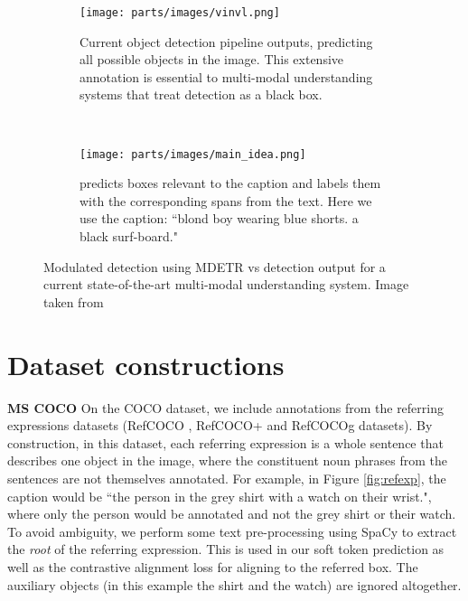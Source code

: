\begin{figure}[t]
     \centering
     \begin{subfigure}[b]{0.48\textwidth}
         \centering
         \texttt{[image: parts/images/vinvl.png]}
         \caption{Current object detection pipeline outputs, predicting all possible objects in the image. This extensive annotation is essential to multi-modal understanding systems that treat detection as a black box.\label{fig:main_idea_1}}
     \end{subfigure}
     ~
     \begin{subfigure}[b]{0.48\textwidth}
         \centering
         \texttt{[image: parts/images/main\_idea.png]}
         \caption{ \Alg predicts boxes relevant to the caption and labels them with the corresponding spans from the text. 
         Here we use the caption: ``blond boy wearing blue shorts. a black surf-board."\label{fig:main_idea_2}}
         
     \end{subfigure}
        \caption{Modulated detection using MDETR vs detection output for a current state-of-the-art multi-modal understanding system. Image taken from \cite{zhang2021vinvl}\label{fig:three graphs}}
\end{figure}

\section{Dataset constructions}
\label{sec:appendix_datasets}
\textbf{MS COCO} On the COCO dataset, we include annotations from the referring expressions datasets (RefCOCO \cite{yu_modeling_2016}, RefCOCO+ \cite{yu_modeling_2016} and RefCOCOg \cite{mao_generation_2016} datasets). 
By construction, in this dataset, each referring expression is a whole sentence that describes one object in the image, where the constituent noun phrases from the sentences are not themselves annotated. For example, in Figure \ref{fig:refexp}, the caption would be ``the person in  the grey shirt with a watch on their wrist.", where only the person would be annotated and not the grey shirt or their watch. To avoid ambiguity, we perform some text pre-processing using SpaCy \cite{spacy} to extract the \textit{root} of the referring expression. This is used in our soft token prediction as well as the contrastive alignment loss for aligning to the referred box. The auxiliary objects (in this example the shirt and the watch) are ignored altogether.



